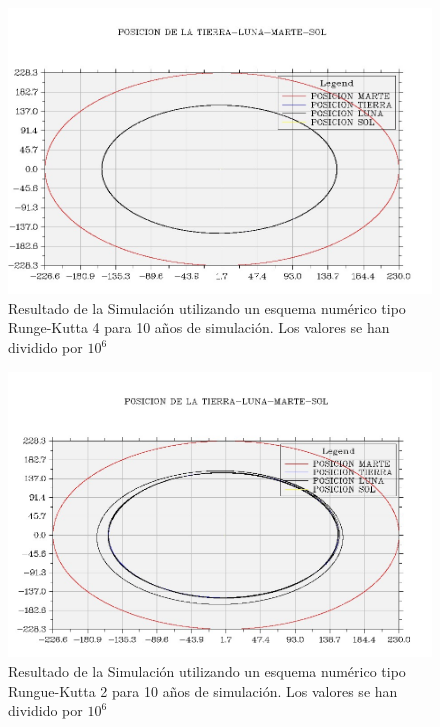\documentclass[11pt,singlespacing,liststotoc,headsepline,a4paper]{article}
\begin{document}
\begin{figure}[H]
	\centering
	\includegraphics[width=1\textwidth]{TLMS10A_RG4.jpg}
	\caption{Resultado de la Simulación utilizando un esquema numérico tipo Runge-Kutta 4 para 10 años de simulación.  Los valores se han dividido por $10^{6}$}
	\label{TLMS10A_RG4}
\end{figure}

\begin{figure}[H]
	\centering
	\includegraphics[width=1\textwidth]{TLMS10A_RG2.jpg}
	\caption{Resultado de la Simulación utilizando un esquema numérico tipo Rungue-Kutta 2 para 10 años de simulación.  Los valores se han dividido por $10^{6}$}
	\label{TLMS10A_RG2}
\end{figure}
\end{document}

